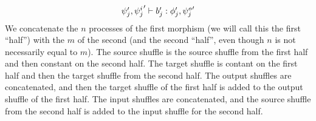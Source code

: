 \documentclass{article}
\begin{document}
\begin{itemize}
\[{\begin{array}{l}
        \psi_j',{\psi_j^i}' \vdash b_j' : \phi_j',{\psi_j^o}'\\
       \end{array}
      }
\]
We concatenate the $n$ processes of the first morphism (we will call
this the first ``half'') with the $m$ of the second (and the second
``half'', even though $n$ is not necessarily equal to $m$).  The source
shuffle is the source shuffle from the first half and then constant on
the second half.  The target shuffle is contant on the first half and
then the target shuffle from the second half.  The output shuffles are
concatenated, and then the target shuffle of the first half is added to
the output shuffle of the first half.  The input shuffles are
concatenated, and the source shuffle from the second half is added to
the input shuffle for the second half.


\end{itemize}
\end{document}
